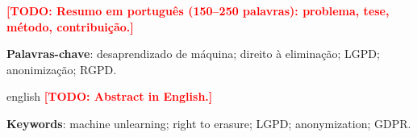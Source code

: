 \documentclass[article,12pt,oneside,a4paper,brazilian]{abntex2}
\newcommand{\todo}[1]{\textcolor{red}{\textbf{[TODO: #1]}}}
\begin{document}
\frenchspacing

\maketitle

\begin{resumo}
\todo{Resumo em português (150--250 palavras): problema, tese, método, contribuição.}

\vspace{\onelineskip}
\noindent
\textbf{Palavras-chave}: desaprendizado de máquina; direito à eliminação; LGPD; anonimização; RGPD.
\end{resumo}

\begin{resumo}[Abstract]
\begin{otherlanguage*}{english}
\todo{Abstract in English.}

\vspace{\onelineskip}
\noindent
\textbf{Keywords}: machine unlearning; right to erasure; LGPD; anonymization; GDPR.
\end{otherlanguage*}
\end{resumo}

\textual










\postextual

\nocite{*}
\printbibliography[title={Referências}]
\end{document}
